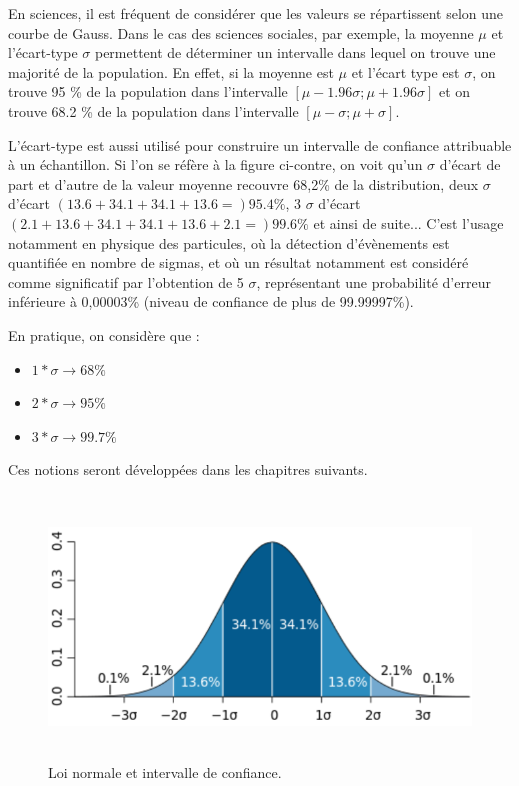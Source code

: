 \documentclass[main.tex]{subfiles}
\begin{document}
En sciences, il est fréquent de considérer que les valeurs se répartissent selon une courbe de Gauss. Dans le cas des sciences sociales, par exemple, la moyenne $\mu$ et l'écart-type $\sigma$ permettent de déterminer un intervalle dans lequel on trouve une majorité de la population. En effet, si la moyenne est $\mu$ et l'écart type est $\sigma$, on trouve 95 \% de la population dans l'intervalle $[ \mu - 1.96 \sigma ; \mu + 1.96 \sigma ]$ et on trouve 68.2 \% de la population dans l'intervalle $[ \mu - \sigma ; \mu + \sigma ]$.

L'écart-type est aussi utilisé pour construire un intervalle de confiance attribuable à un échantillon. Si l'on se réfère à la figure ci-contre, on voit qu'un $\sigma$ d'écart de part et d'autre de la valeur moyenne recouvre 68,2\% de la distribution, deux $\sigma$ d'écart $(13.6+34.1+34.1+13.6 =) 95.4\%$, 3 $\sigma$ d'écart $(2.1+13.6+34.1+34.1+13.6+2.1 =) 99.6\%$ et ainsi de suite... C'est l'usage notamment en physique des particules, où la détection d'évènements est quantifiée en nombre de sigmas, et où un résultat notamment est considéré comme significatif par l'obtention de 5 $\sigma$, représentant une probabilité d'erreur inférieure à 0,00003\% (niveau de confiance de plus de 99.99997\%).

En pratique, on considère que :
\begin{itemize}

    \item $1 * \sigma \rightarrow 68\% $
    \item $2 * \sigma \rightarrow 95\% $
    \item $3 * \sigma \rightarrow 99.7\%$

\end{itemize}

Ces notions seront développées dans les chapitres suivants.

\begin{figure}
    \centering
    \includegraphics[height=7cm]{assets/figures/3_9_Loi_normale_et_intervale_de_confiance.PNG}
    \caption{Loi normale et intervalle de confiance.}
    \label{fig:3_9_Loi_normale_et_intervale_de_confiance}
\end{figure}
\end{document}
